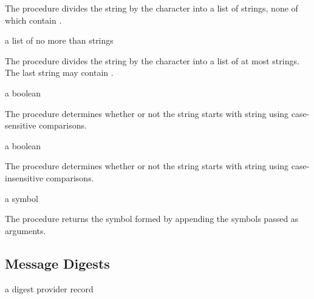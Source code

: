 The  procedure divides the  string by the
 character into a list of strings, none of which
contain .

\begin{procedure}
\end{procedure}
\returns{} a list of no more than  strings

The  procedure divides the  string by the
 character into a list of at most  strings. The
last string may contain .

\begin{procedure}
\end{procedure}
\returns{} a boolean

The  procedure determines whether or not the string
 starts with string  using case-sensitive comparisons.

\begin{procedure}
\end{procedure}
\returns{} a boolean

The  procedure determines whether or not the
string  starts with string  using case-insensitive
comparisons.

\begin{procedure}
\end{procedure}
\returns{} a symbol

The  procedure returns the symbol formed by
appending the symbols passed as arguments.

\subsection {Message Digests}

\begin{procedure}
\end{procedure}
\returns{} a digest provider record

